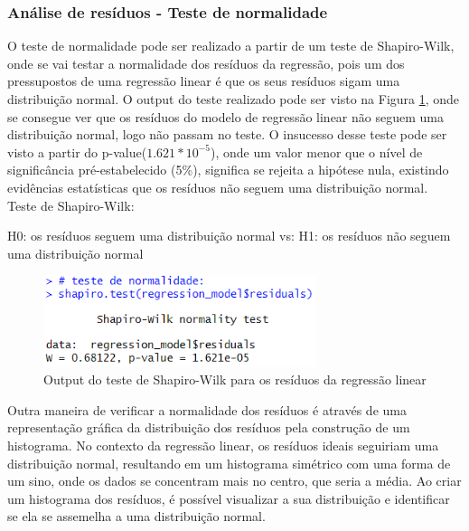 \documentclass[%
 aip,
cp,  %
 amsmath,amssymb,%
 reprint,%
]{revtex4-2}
\begin{document}
\subsubsection{Análise de resíduos - Teste de normalidade}
O teste de normalidade pode ser realizado a partir de um teste de Shapiro-Wilk, onde se vai testar a normalidade dos resíduos da regressão, pois um dos pressupostos de uma regressão linear é que os seus resíduos sigam uma distribuição normal. O output do teste realizado pode ser visto na Figura \ref{questao4OutputTesteShapiro}, onde se consegue ver que os resíduos do modelo de regressão linear não seguem uma distribuição normal, logo não passam no teste. O insucesso desse teste pode ser visto a partir do p-value($1.621*10^{-5}$), onde um valor menor que o nível de significância pré-estabelecido (5\%), significa se rejeita a hipótese nula, existindo evidências estatísticas que os resíduos não seguem uma distribuição normal. \\

Teste de Shapiro-Wilk:
\begin{center}
    H0: os resíduos seguem uma distribuição normal
    \newline
    vs:
    \newline
    H1: os resíduos não seguem uma distribuição normal
    \newline
\end{center}

\begin{figure}[!h]
    \centering
    \includegraphics[width=8cm]{imagens/questao4/testeShapiroResiduosPergunta4.png}
    \caption{Output do teste de Shapiro-Wilk para os resíduos da regressão linear}
    \label{questao4OutputTesteShapiro}
\end{figure}

Outra maneira de verificar a normalidade dos resíduos é através de uma representação gráfica da distribuição dos resíduos pela construção de um histograma. No contexto da regressão linear, os resíduos ideais seguiriam uma distribuição normal, resultando em um histograma simétrico com uma forma de um sino, onde os dados se concentram mais no centro, que seria a média. Ao criar um histograma dos resíduos, é possível visualizar a sua distribuição e identificar se ela se assemelha a uma distribuição normal.
\end{document}

